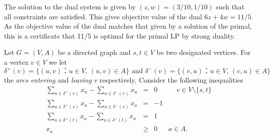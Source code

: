 \documentclass[11pt]{article}
\begin{document}
The solution to the dual system is given by $(z, w) = (3/10, 1/10)$ such that all constraints are satisfied. This gives objective value of the dual $6z + 4w = 11/5$. As the objective value of the dual matches that given by a solution of the primal, this is a certificate that 11/5 is optimal for the primal LP by strong duality. 

\newpage 
\problem

 Let $G = (V,A)$ be a directed graph and $s,t ∈ V$ be two designated vertices. For a vertex $v ∈ V$ we let
  \begin{displaymath}
    δ^+(v) = \{ (u,v) ： u ∈ V, \, (u,v) ∈A\} \text{ and } δ^-(v) = \{ (v,u) ： u ∈ V, \, (v,u) ∈A\}
  \end{displaymath}
  the \emph{arcs entering} and \emph{leaving} $v$ respectively.  Consider the following inequalities
  \begin{equation} 
    \begin{array}{rclc}      \displaystyle 
    ∑_{a ∈ δ^+(v) } x_a -  ∑_{a ∈ δ^-(v) } x_a & = &  0 & \, \quad v ∈ V \setminus \{s,t\} \\ \displaystyle 
      ∑_{a ∈ δ^+(s) } x_a -  ∑_{a ∈ δ^-(s) } x_a & = &  -1 & \\
      \displaystyle 
      ∑_{a ∈ δ^+(t) } x_a -  ∑_{a ∈ δ^-(t) } x_a & = &  1 & \\
      x_a &≥& 0 & a ∈A.
    \end{array}
    \label{eq:1}
  \end{equation}
  
\end{document}
